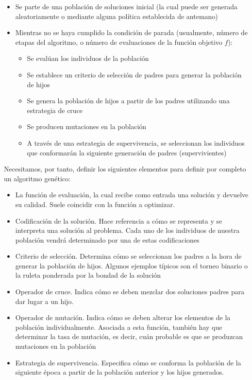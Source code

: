 \documentclass[
  a4paper,
,tablecaptionabove
]{scrartcl}
\providecommand{\tightlist}{%
  \setlength{\itemsep}{0pt}\setlength{\parskip}{0pt}}
\begin{document}
\begin{itemize}
\tightlist
\item
  Se parte de una población de soluciones inicial (la cual puede ser
  generada aleatoriamente o mediante alguna política establecida de
  antemano)
\item
  Mientras no se haya cumplido la condición de parada (usualmente,
  número de etapas del algoritmo, o número de evaluaciones de la función
  objetivo \(f\)):

  \begin{itemize}
  \tightlist
  \item
    Se evalúan los individuos de la población
  \item
    Se establece un criterio de selección de padres para generar la
    población de hijos
  \item
    Se genera la población de hijos a partir de los padres utilizando
    una estrategia de cruce
  \item
    Se producen mutaciones en la población
  \item
    A través de una estrategia de supervivencia, se seleccionan los
    individuos que conformarán la siguiente generación de padres
    (supervivientes)
  \end{itemize}
\end{itemize}

Necesitamos, por tanto, definir los siguientes elementos para definir
por completo un algoritmo genético:

\begin{itemize}
\tightlist
\item
  La función de evaluación, la cual recibe como entrada una solución y
  devuelve su calidad. Suele coincidir con la función a optimizar.
\item
  Codificación de la solución. Hace referencia a cómo se representa y se
  interpreta una solución al problema. Cada uno de los individuos de
  nuestra población vendrá determinado por una de estas codificaciones
\item
  Criterio de selección. Determina cómo se seleccionan los padres a la
  hora de generar la población de hijos. Algunos ejemplos típicos son el
  torneo binario o la ruleta ponderada por la bondad de la solución
\item
  Operador de cruce. Indica cómo se deben mezclar dos soluciones padres
  para dar lugar a un hijo.
\item
  Operador de mutación. Indica cómo se deben alterar los elementos de la
  población individualmente. Asociada a esta función, también hay que
  determinar la tasa de mutación, es decir, cuán probable es que se
  produzcan mutaciones en la población
\item
  Estrategia de supervivencia. Especifica cómo se conforma la población
  de la siguiente época a partir de la población anterior y los hijos
  generados.
\end{itemize}
\end{document}
